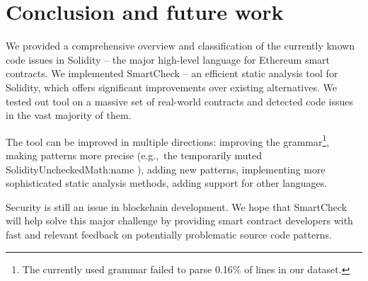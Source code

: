 \section{Conclusion and future work}
	
We provided a comprehensive overview and classification of the currently known code issues in Solidity -- the major high-level language for Ethereum smart contracts.
We implemented SmartCheck -- an efficient static analysis tool for Solidity, which offers significant improvements over existing alternatives.
We tested out tool on a massive set of real-world contracts and detected code issues in the vast majority of them.

The tool can be improved in multiple directions: improving the grammar\footnote{The currently used grammar failed to parse 0.16\% of lines in our dataset.}, making patterns more precise (e.g.,~the temporarily muted {\usevalue SolidityUncheckedMath:name }), adding new patterns, implementing more sophisticated static analysis methods, adding support for other languages.

Security is still an issue in blockchain development.
We hope that SmartCheck will help solve this major challenge by providing smart contract developers with fast and relevant feedback on potentially problematic source code patterns.